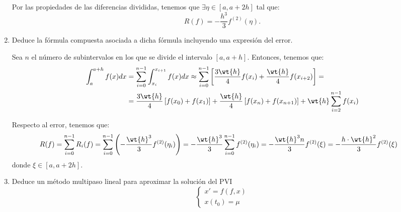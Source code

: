 \begin{ejercicio}
\begin{enumerate}
        Por las propiedades de las diferencias divididas, tenemos que $\exists \eta\in [a, a + 2h]$ tal que:
        \begin{equation*}
            R(f) = -\dfrac{h^3}{3}f^{(2)}(\eta).
        \end{equation*}
        \item Deduce la fórmula compuesta asociada a dicha fórmula incluyendo una expresión del error.
        
        Sea $n$ el número de subintervalos en los que se divide el intervalo $[a, a + h]$. Entonces, tenemos que:
        \begin{align*}
            \int_{a}^{a + h} f(x)dx &= \sum_{i=0}^{n-1}\int_{x_i}^{x_{i+1}} f(x)dx
            \approx \sum_{i=0}^{n-1}\left[\frac{3\wt{h}}{4}f(x_i) + \frac{\wt{h}}{4}f(x_{i+2})\right]
            =\\&= \dfrac{3\wt{h}}{4}\left[f(x_0) + f(x_1)\right] + \dfrac{\wt{h}}{4}\left[f(x_n) + f(x_{n+1})\right]
            + \wt{h}\sum_{i=2}^{n-1}f(x_i)
        \end{align*}

        Respecto al error, tenemos que:
        \begin{align*}
            R(f) &= \sum_{i=0}^{n-1}R_i(f) = \sum_{i=0}^{n-1}\left(-\dfrac{\wt{h}^3}{3}f^{(2)}(\eta_i)\right)
            = -\dfrac{\wt{h}^3}{3}\sum_{i=0}^{n-1}f^{(2)}(\eta_i)
            = -\dfrac{\wt{h}^3n}{3}f^{(2)}(\xi)
            = -\dfrac{h\cdot \wt{h}^2}{3}f^{(2)}(\xi)
        \end{align*}
        donde $\xi\in [a, a + 2h]$.
        \item Deduce un método multipaso lineal para aproximar la solución del PVI
        \begin{equation*}
            \begin{cases}
                x' = f(f, x) \\
                x(t_0) = \mu
            \end{cases}
        \end{equation*}

    \end{enumerate}
\end{ejercicio}

